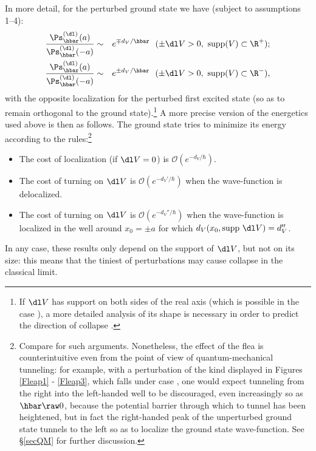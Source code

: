 \documentclass[12pt]{article}
\begin{document}
\noindent In more detail, for the perturbed ground state we have (subject to assumptions 1--4): 
\begin{eqnarray}
{\frac{\Ps^{(\dl)}_{\hbar}(a)}{\Ps^{(\dl)}_{\hbar}(-a)}}&\sim&  e^{\mp d_V/\hbar} \:\:\: (\pm \dl V>0, \mbox{ supp} (V)\subset \R^+);
\label{case1}\\
{\frac{\Ps^{(\dl)}_{\hbar}(a)}{\Ps^{(\dl)}_{\hbar}(-a)}}&\sim&  e^{\pm d_V/\hbar} \:\:\: (\pm \dl V>0, \mbox{ supp} (V)\subset \R^-),\label{case3}
\end{eqnarray}
with the opposite localization for the perturbed first excited state (so as to remain orthogonal to the ground state).\footnote{If $\dl V$ has support on both sides of the real axis (which is possible in the case ), a more detailed analysis of its shape  is necessary in order to predict the direction of collapse \cite{Cesi1}.}  A more precise version of the energetics used above is then as follows. The ground state tries to minimize its energy according to the rules:\footnote{Compare \cite[p.\ 35]{RS4,Simon4} for such arguments. Nonetheless, the effect of the flea is counterintuitive even from the point of view of quantum-mechanical tunneling: for example, with a perturbation of the kind displayed in Figures  \ref{Fleap1} - \ref{Fleap3}, which falls under case , one would expect tunneling from the right into the left-handed well to be discouraged, even increasingly so as $\hbar\raw 0$, because the potential barrier through which to tunnel has been heightened,
 but in fact the right-handed peak of the unperturbed ground state tunnels to the left so as to localize the ground state wave-function. See  \S  \ref{secQM} for further discussion.}
\begin{itemize}
\item The cost of localization (if $\dl V=0$)  is $\mathcal{O}(e^{-d_V/\hbar})$.
\item The cost of turning on $\dl V$ is $\mathcal{O}(e^{-d_V'/\hbar})$ when the wave-function is delocalized.
\item The cost of turning on $\dl V$ is $\mathcal{O}(e^{-d_V''/\hbar})$ when the wave-function is localized in the well around $x_0=\pm a$ for which $d_V(x_0,\mbox{supp}\ \dl V)=d_V''$.
\end{itemize}
In any case, these results only depend on the support of $\dl V$,  but not on its size: this means that the tiniest of perturbations may cause collapse in the classical limit. 
\end{document}
